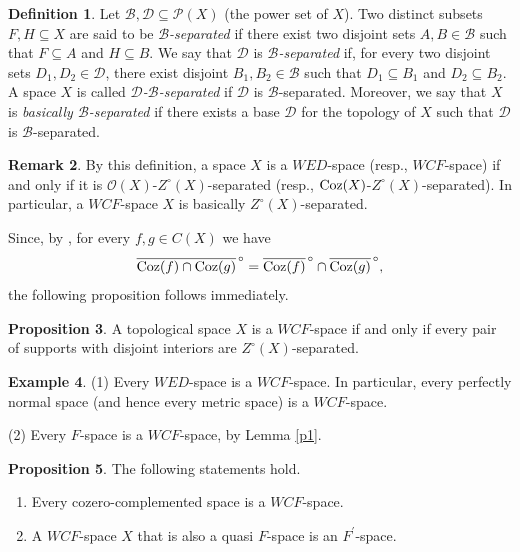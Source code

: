 \documentclass{amsart}
\theoremstyle{definition}
\theoremstyle{remark}
\numberwithin{equation}{section}
\newcommand{\CO}{\mathcal{O}}
\newcommand{\coz}{{\rm Coz}}
\newcommand{\cc}{\circ}
\theoremstyle{definition}\newtheorem{thm}{Theorem}[section]
\theoremstyle{definition}\newtheorem{cor}[thm]{Corollary}
\theoremstyle{definition}\newtheorem{lem}[thm]{Lemma}
\theoremstyle{definition}\newtheorem{prop}[thm]{Proposition}
\theoremstyle{definition}\newtheorem{defn}[thm]{Definition}
\theoremstyle{definition}\newtheorem{Rem}[thm]{Remark}
\theoremstyle{remark}\newtheorem{rem}[thm]{Remark}
\theoremstyle{definition}\newtheorem{exam}[thm]{Example}
\theoremstyle{definition}\newtheorem{qu}[thm]{question}
\begin{document}
\begin{defn}
Let $\mathcal{B}, \mathcal{D} \subseteq \mathcal{P}(X)$ (the power set of $X$).  
Two distinct subsets $F,H \subseteq X$ are said to be \emph{$\mathcal{B}$-separated} if there exist two disjoint sets $A,B \in \mathcal{B}$ such that $F \subseteq A$ and $H \subseteq B$.  
We say that $\mathcal{D}$ is \emph{$\mathcal{B}$-separated} if, for every two disjoint sets $D_1,D_2 \in \mathcal{D}$, there exist disjoint $B_1,B_2 \in \mathcal{B}$ such that $D_1 \subseteq B_1$ and $D_2 \subseteq B_2$.  
A space $X$ is called \emph{$\mathcal{D}$-$\mathcal{B}$-separated} if $\mathcal{D}$ is $\mathcal{B}$-separated.  
Moreover, we say that $X$ is \emph{basically $\mathcal{B}$-separated} if there exists a base $\mathcal{D}$ for the topology of $X$ such that $\mathcal{D}$ is $\mathcal{B}$-separated.
\end{defn}
\begin{Rem}
By this definition, a space $X$ is a $WED$-space (resp., $WCF$-space) if and only if it is $\CO(X)$-$Z^\cc(X)$-separated (resp., $\coz(X)$-$Z^\cc(X)$-separated).  
In particular, a $WCF$-space $X$ is basically $Z^\cc(X)$-separated.
\end{Rem}
Since, by \cite[Lemma 2.11]{AlTaTa}, for every $f,g\in C(X)$ we have
\[
\overline{\coz(f)\cap \coz(g)}^{\,\cc}
= \overline{\coz(f)}^{\,\cc}\cap \overline{\coz(g)}^{\,\cc},
\]
the following proposition follows immediately.

\begin{prop}
A topological space $X$ is a $WCF$-space if and only if every pair of supports with disjoint interiors are $Z^\cc(X)$-separated.
\end{prop}

\begin{exam}
(1) Every $WED$-space is a $WCF$-space. In particular, every perfectly normal space (and hence every metric space) is a $WCF$-space.

(2) Every $F$-space is a $WCF$-space,  by Lemma \ref{p1}.
\end{exam}
\begin{prop}
The following statements hold.
\begin{enumerate}
\item Every cozero-complemented space is a $WCF$-space.

\item A $WCF$-space $X$  that is also a quasi $F$-space is an $F^{\prime}$-space.
\end{enumerate}
\end{prop}
\end{document}
